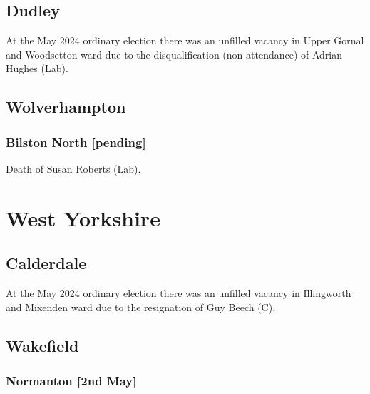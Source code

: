 \documentclass[a4paper,openany]{book}
\begin{document}
\begin{resultsiii}
\subsection*{Dudley}

At the May 2024 ordinary election there was an unfilled vacancy in Upper Gornal and Woodsetton ward due to the disqualification (non-attendance) of Adrian Hughes (Lab).%

\subsection*{Wolverhampton}

\subsubsection*{Bilston North \hspace*{\fill}\nolinebreak[1]%
	\enspace\hspace*{\fill}
	[pending]}


Death of Susan Roberts (Lab).

\section{West Yorkshire}

\subsection*{Calderdale}

At the May 2024 ordinary election there was an unfilled vacancy in Illingworth and Mixenden ward due to the resignation of Guy Beech (C).%

\subsection*{Wakefield}

\subsubsection*{Normanton \hspace*{\fill}\nolinebreak[1]%
	\enspace\hspace*{\fill}
	[2nd May]}


\end{resultsiii}
\end{document}
